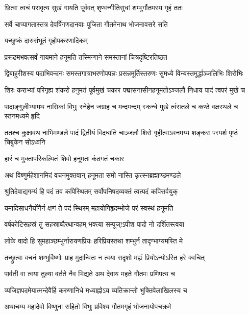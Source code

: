\twolineshloka
{छित्वा त्वचं परावृत्य सुखं गायति पूर्ववत्}
{शृण्वन्गीतिसुधां शम्भुर्गौतमस्य गृहं ततः}%

\twolineshloka
{सर्वे चाप्यागतास्तत्र देवर्षिगणदानवाः}
{पूजिता गौतमेनाथ भोजनावसरे सति}%

\twolineshloka
{यच्छुष्कं दारुसंभूतं गृहोपकरणादिकम्}

\twolineshloka
{प्ररूढमभवत्सर्वं गायमाने हनूमति}%
{तस्मिन्गाने समस्तानां चित्रदृष्टिरतिष्ठत}%

\twolineshloka
{द्विबाहुरीशस्य पदाभिवन्दनः समस्तगात्राभरणोपपन्नः}
{प्रसन्नमूर्तिस्तरुणः सुमध्ये विन्यस्तमूर्द्धाञ्जलिभिः शिरोभिः}%

\twolineshloka
{शिरः कराभ्यां परिगृह्य शंकरो हनुमतं पूर्वमुखं चकार}
{पद्मासनासीनहनूमतोऽञ्जलौ निधाय पादं त्वपरं मुखे च}%

\twolineshloka
{पादाङ्गुलीभ्यामथ नासिकां विभुः स्नेहेन जग्राह च मन्दमन्दम्}
{स्कन्धे मुखे त्वंसतले च कण्ठे वक्षस्थले च स्तनमध्यमे हृदि}%

\twolineshloka
{ततश्च कुक्षावथ नाभिमण्डले पादं द्वितीयं विदधाति चाञ्जलौ}
{शिरो गृहीत्वाऽवनमय्य शङ्करः पस्पर्श पृष्ठं चिबुकेन सोऽध्वनि}%

\onelineshloka
{हारं च मुक्तापरिकल्पितं शिवो हनूमतः कंठगतं चकार}%

\twolineshloka
{अथ विष्णुर्महेशानमिदं वचनमुक्तवान्}
{हनूमता समो नास्ति कृत्स्नब्रह्माण्डमण्डले}%

\twolineshloka
{श्रुतिदेवाद्यगम्यं हि पदं तव कपिस्थितम्}
{सर्वोपनिषदव्यक्तं त्वत्पदं कपिसर्वयुक्}%

\twolineshloka
{यमादिसाधनैर्योगैर्न क्षणं ते पदं स्थिरम्}
{महायोगिहृदम्भोजे परं स्वस्थं हनूमति}%

\twolineshloka
{वर्षकोटिसहस्रं तु सहस्राब्दैरथान्वहम्}
{भक्त्या सम्पूज्!ऽपीश पादो नो दर्शितस्त्वया}%

\twolineshloka
{लोके वादो हि सुमहाञ्छम्भुर्नारायणप्रियः}
{हरिप्रियस्तथा शम्भुर्न तादृग्भाग्यमस्ति मे}%

\twolineshloka
{तच्छ्रुत्वा वचनं शम्भुर्विष्णोः प्राह मुदान्वितः}
{न त्वया सदृशो मह्यं प्रियोऽन्योऽस्ति हरे क्वचित्}%

\twolineshloka
{पार्वती वा त्वया तुल्या वर्तते नैव भिद्यते}
{अथ देवाय महते गौतमः प्रणिपत्य च}%

\twolineshloka
{व्यजिज्ञपदमेयात्मन्देवैर्हि करुणानिधे}
{मध्याह्नोऽय व्यतिक्रान्तो भुक्तिवेलाखिलस्य च}%

\twolineshloka
{अथाचम्य महादेवो विष्णुना सहितो विभुः}
{प्रविश्य गौतमगृहं भोजनायोपचक्रमे}%

